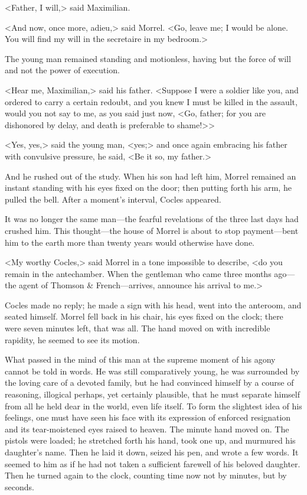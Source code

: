  <Father, I will,> said Maximilian. 

 <And now, once more, adieu,> said Morrel. <Go, leave me; I would be alone. You will find my will in the secretaire in my bedroom.> 

 The young man remained standing and motionless, having but the force of will and not the power of execution. 

 <Hear me, Maximilian,> said his father. <Suppose I were a soldier like you, and ordered to carry a certain redoubt, and you knew I must be killed in the assault, would you not say to me, as you said just now, <Go, father; for you are dishonored by delay, and death is preferable to shame!>> 

 <Yes, yes,> said the young man, <yes;> and once again embracing his father with convulsive pressure, he said, <Be it so, my father.> 

 And he rushed out of the study. When his son had left him, Morrel remained an instant standing with his eyes fixed on the door; then putting forth his arm, he pulled the bell. After a moment's interval, Cocles appeared. 

 It was no longer the same man—the fearful revelations of the three last days had crushed him. This thought—the house of Morrel is about to stop payment—bent him to the earth more than twenty years would otherwise have done. 

 <My worthy Cocles,> said Morrel in a tone impossible to describe, <do you remain in the antechamber. When the gentleman who came three months ago—the agent of Thomson \& French—arrives, announce his arrival to me.> 

 Cocles made no reply; he made a sign with his head, went into the anteroom, and seated himself. Morrel fell back in his chair, his eyes fixed on the clock; there were seven minutes left, that was all. The hand moved on with incredible rapidity, he seemed to see its motion. 

 What passed in the mind of this man at the supreme moment of his agony cannot be told in words. He was still comparatively young, he was surrounded by the loving care of a devoted family, but he had convinced himself by a course of reasoning, illogical perhaps, yet certainly plausible, that he must separate himself from all he held dear in the world, even life itself. To form the slightest idea of his feelings, one must have seen his face with its expression of enforced resignation and its tear-moistened eyes raised to heaven. The minute hand moved on. The pistols were loaded; he stretched forth his hand, took one up, and murmured his daughter's name. Then he laid it down, seized his pen, and wrote a few words. It seemed to him as if he had not taken a sufficient farewell of his beloved daughter. Then he turned again to the clock, counting time now not by minutes, but by seconds. 

